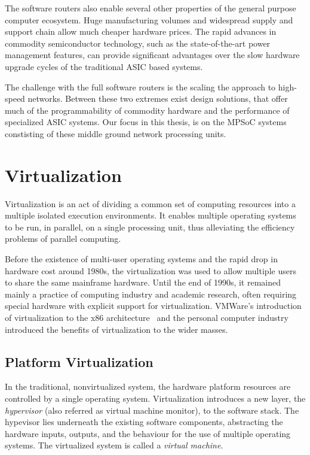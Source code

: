 The software routers also enable several other properties of the general purpose computer ecosystem. Huge manufacturing volumes and widespread supply and support chain allow much cheaper hardware prices. The rapid advances in commodity semiconductor technology, such as the state-of-the-art power management features, can provide significant advantages over the slow hardware upgrade cycles of the traditional ASIC based systems.~\cite{Dobrescu:2009:REP}

The challenge with the full software routers is the scaling the approach to high-speed networks. Between these two extremes exist design solutions, that offer much of the programmability of commodity hardware and the performance of specialized ASIC systems. Our focus in this thesis, is on the MPSoC systems constisting of these middle ground network processing units.~\cite{Dobrescu:2009:REP}

\section{Virtualization}
\label{section:virtualization}
Virtualization is an act of dividing a common set of computing resources into a multiple isolated execution environments. It enables multiple operating systems to be run, in parallel, on a single processing unit, thus alleviating the efficiency problems of parallel computing.

Before the existence of multi-user operating systems and the rapid drop in hardware cost around 1980s, the virtualization was used to allow multiple users to share the same mainframe hardware. Until the end of 1990s, it remained mainly a practice of computing industry and academic research, often requiring special hardware with explicit support for virtualization. VMWare's introduction of virtualization to the x86 architecture~\cite{Walters:1999:VVP} and the personal computer industry introduced the benefits of virtualization to the wider masses.~\cite{Bugnion:2012:BVX, Barham:2003:XAV}

\subsection{Platform Virtualization}
In the traditional, nonvirtualized system, the hardware platform resources are controlled by a single operating system. Virtualization introduces a new layer, the \emph{hypervisor} (also referred as virtual machine monitor), to the software stack. The hypevisor lies underneath the existing software components, abstracting the hardware inputs, outputs, and the behaviour for the use of multiple operating systems. The virtualized system is called a \emph{virtual machine}.~\cite{Uhlig:2005:IVT, Bugnion:2012:BVX, Barham:2003:XAV}

